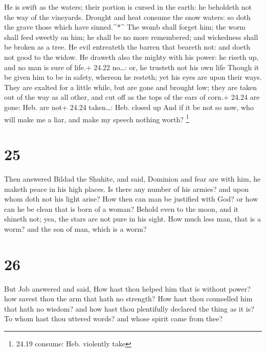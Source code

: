  He is swift as the waters; their portion is cursed in the
earth: he beholdeth not the way of the vineyards.  Drought
and heat consume the snow waters: so doth the grave those which have
sinned.\^{}*\^{}  The womb shall forget him; the worm shall
feed sweetly on him; he shall be no more remembered; and wickedness
shall be broken as a tree.  He evil entreateth the barren
that beareth not: and doeth not good to the widow.  He
draweth also the mighty with his power: he riseth up, and no man is sure
of life.+ 24.22 no\ldots: or, he trusteth not his own life 
Though it be given him to be in safety, whereon he resteth; yet his eyes
are upon their ways.  They are exalted for a little while,
but are gone and brought low; they are taken out of the way as all
other, and cut off as the tops of the ears of corn.+ 24.24 are gone:
Heb. are not+ 24.24 taken\ldots: Heb. closed up  And if it
be not so now, who will make me a liar, and make my speech nothing
worth? \footnote{24.19 consume: Heb. violently take}

\hypertarget{section-24}{%
\section{25}\label{section-24}}

 Then answered Bildad the Shuhite, and said, 
Dominion and fear are with him, he maketh peace in his high places.
 Is there any number of his armies? and upon whom doth not
his light arise?  How then can man be justified with God? or
how can he be clean that is born of a woman?  Behold even to
the moon, and it shineth not; yea, the stars are not pure in his sight.
 How much less man, that is a worm? and the son of man,
which is a worm?

\hypertarget{section-25}{%
\section{26}\label{section-25}}

 But Job answered and said,  How hast thou
helped him that is without power? how savest thou the arm that hath no
strength?  How hast thou counselled him that hath no wisdom?
and how hast thou plentifully declared the thing as it is? 
To whom hast thou uttered words? and whose spirit came from thee?

